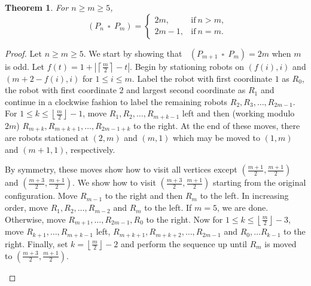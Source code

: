 \documentclass[a4paper,12pt]{article}
\DeclareMathOperator{\mobmv}{Mob_{\mu}}
\DeclareMathOperator{\cp}{\,\square\,}
\newtheorem{theorem}{Theorem}[section]
\theoremstyle{definition}
\begin{document}
	
	\begin{theorem}
		For $n \geq m \geq 5$, \[\mobmv(P_n \cp P_m) =
		\begin{cases}
			2m, & \text{if}\ n > m, \\
			2m-1, & \text{if}\ n = m.
		\end{cases}
		\]
		\label{largecartgrids}
	\end{theorem}
	\begin{proof}
		Let $n \geq m \geq 5$. We start by showing that $\mobmv(P_{m+1} \cp P_m) = 2m$ when $m$ is odd. Let $f(t)=1+|\left \lceil \frac{m}{2} \right \rceil - t|$. Begin by stationing robots on $(f(i),i)$ and $(m+2-f(i), i)$ for $1 \leq i \leq m$. Label the robot with first coordinate $1$ as $R_0$, the robot with first coordinate $2$ and largest second coordinate as $R_1$ and continue in a clockwise fashion to label the remaining robots $R_2, R_3, \dots, R_{2m-1}$. For $1 \leq k \leq \left \lfloor \frac{m}{2} \right \rfloor - 1$, move $R_1, R_2, \dots, R_{m+k-1}$ left and then (working modulo $2m$) $R_{m+k}, R_{m+k+1}, \dots, R_{2m-1+k}$ to the right. At the end of these moves, there are robots stationed at $(2, m)$ and $(m,1)$ which may be moved to $(1,m)$ and $(m+1,1)$, respectively.
		
		By symmetry, these moves show how to visit all vertices except $(\frac{m+1}{2}, \frac{m+1}{2})$ and $(\frac{m+3}{2}, \frac{m+1}{2})$. We show how to visit $(\frac{m+3}{2}, \frac{m+1}{2})$ starting from the original configuration. Move $R_{m-1}$ to the right and then $R_m$ to the left. In increasing order, move $R_1, R_2, \dots, R_{m-2}$ and $R_{m}$ to the left. If $m=5$, we are done. Otherwise, move $R_{m+1}, \dots, R_{2m-1}, R_{0}$ to the right. Now for $1 \leq k \leq \left \lfloor \frac{m}{2} \right \rfloor - 3$, move $R_{k+1}, \dots, R_{m+k-1}$ left, $R_{m+k+1}, R_{m+k+2}, \dots, R_{2m-1}$ and $R_0, \dots R_{k-1}$ to the right. Finally, set $k = \left \lfloor \frac{m}{2} \right \rfloor - 2$ and perform the sequence up until $R_m$ is moved to $(\frac{m+3}{2}, \frac{m+1}{2})$.
		
		\begin{figure}
			\captionsetup{justification=centering}
			\centering
			\begin{subfigure}{.4\textwidth}
				\centering
				
				\begin{tikzpicture}[x=0.2mm,y=-0.2mm,inner sep=0.5mm,scale=1,thick,vertex/.style={circle,draw,minimum size=10},
					occupied/.style={fill=black},
					occupied20/.style = {occupied},
					occupied11/.style = {occupied},
					occupied02/.style = {occupied},
					occupied03/.style = {occupied},
					occupied14/.style = {occupied},
					occupied25/.style = {occupied},
					occupied34/.style = {occupied},
					occupied43/.style = {occupied},
					occupied42/.style = {occupied},
					occupied31/.style = {occupied},]
					

\end{tikzpicture}
\end{subfigure}
\end{figure}
\end{proof}
\end{document}
